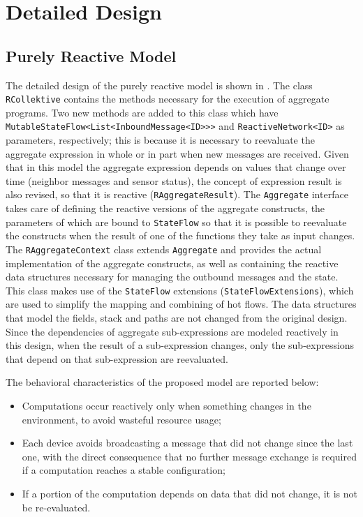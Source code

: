 \section{Detailed Design}

\subsection{Purely Reactive Model}
\label{subsection:purely-reactive-model}

The detailed design of the purely reactive model is shown in . The class \texttt{RCollektive} contains the methods necessary for the execution of aggregate programs. Two new methods are added to this class which have \texttt{MutableStateFlow<List<InboundMessage<ID>>>} and \texttt{ReactiveNetwork<ID>} as parameters, respectively; this is because it is necessary to reevaluate the aggregate expression in whole or in part when new messages are received. Given that in this model the aggregate expression depends on values that change over time (neighbor messages and sensor status), the concept of expression result is also revised, so that it is reactive (\texttt{RAggregateResult}). The \texttt{Aggregate} interface takes care of defining the reactive versions of the aggregate constructs, the parameters of which are bound to \texttt{StateFlow} so that it is possible to reevaluate the constructs when the result of one of the functions they take as input changes. The \texttt{RAggregateContext} class extends \texttt{Aggregate} and provides the actual implementation of the aggregate constructs, as well as containing the reactive data structures necessary for managing the outbound messages and the state. This class makes use of the \texttt{StateFlow} extensions (\texttt{StateFlowExtensions}), which are used to simplify the mapping and combining of hot flows. The data structures that model the fields, stack and paths are not changed from the original design. Since the dependencies of aggregate sub-expressions are modeled reactively in this design, when the result of a sub-expression changes, only the sub-expressions that depend on that sub-expression are reevaluated.

The behavioral characteristics of the proposed model are reported below:

\begin{itemize}
    \item Computations occur reactively only when something changes in the environment, to avoid wasteful resource usage;
    \item Each device avoids broadcasting a message that did not change since the last one, with the direct consequence that no further message exchange is required if a computation reaches a stable configuration;
    \item If a portion of the computation depends on data that did not change, it is not be re-evaluated.
\end{itemize}


